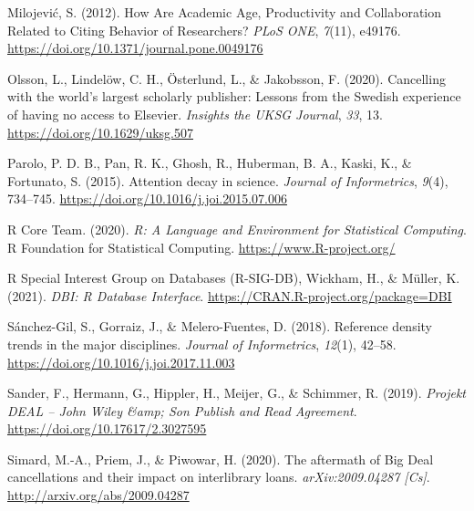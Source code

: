 \documentclass[
]{article}
\newlength{\cslhangindent}
\newlength{\cslentryspacingunit} %
\newenvironment{CSLReferences}[2] %
 {%
  \setlength{\parindent}{0pt}
  \ifodd #1
  \let\oldpar\par
  \def\par{\hangindent=\cslhangindent\oldpar}
  \fi
  \setlength{\parskip}{#2\cslentryspacingunit}
 }%
 {}
\begin{document}
\begin{CSLReferences}{1}{0}
\leavevmode{}%
Milojević, S. (2012). How {Are} {Academic} {Age}, {Productivity} and {Collaboration} {Related} to {Citing} {Behavior} of {Researchers}? \emph{PLoS ONE}, \emph{7}(11), e49176. \url{https://doi.org/10.1371/journal.pone.0049176}

\leavevmode{}%
Olsson, L., Lindelöw, C. H., Österlund, L., \& Jakobsson, F. (2020). Cancelling with the world's largest scholarly publisher: Lessons from the {Swedish} experience of having no access to {Elsevier}. \emph{Insights the UKSG Journal}, \emph{33}, 13. \url{https://doi.org/10.1629/uksg.507}

\leavevmode{}%
Parolo, P. D. B., Pan, R. K., Ghosh, R., Huberman, B. A., Kaski, K., \& Fortunato, S. (2015). Attention decay in science. \emph{Journal of Informetrics}, \emph{9}(4), 734--745. \url{https://doi.org/10.1016/j.joi.2015.07.006}

\leavevmode{}%
R Core Team. (2020). \emph{R: {A} {Language} and {Environment} for {Statistical} {Computing}}. R Foundation for Statistical Computing. \url{https://www.R-project.org/}

\leavevmode{}%
R Special Interest Group on Databases (R-SIG-DB), Wickham, H., \& Müller, K. (2021). \emph{{DBI}: {R} {Database} {Interface}}. \url{https://CRAN.R-project.org/package=DBI}

\leavevmode{}%
Sánchez-Gil, S., Gorraiz, J., \& Melero-Fuentes, D. (2018). Reference density trends in the major disciplines. \emph{Journal of Informetrics}, \emph{12}(1), 42--58. \url{https://doi.org/10.1016/j.joi.2017.11.003}

\leavevmode{}%
Sander, F., Hermann, G., Hippler, H., Meijer, G., \& Schimmer, R. (2019). \emph{Projekt {DEAL} -- {John} {Wiley} \&amp; {Son} {Publish} and {Read} {Agreement}}. \url{https://doi.org/10.17617/2.3027595}

\leavevmode{}%
Simard, M.-A., Priem, J., \& Piwowar, H. (2020). The aftermath of {Big} {Deal} cancellations and their impact on interlibrary loans. \emph{arXiv:2009.04287 {[}Cs{]}}. \url{http://arxiv.org/abs/2009.04287}


\end{CSLReferences}
\end{document}
